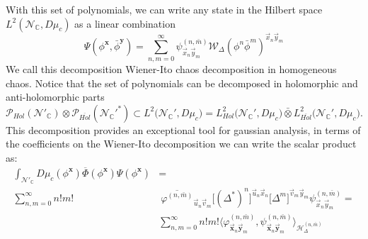 \documentclass[12pt]{article}%
\begin{document}
 With this set of polynomials, we can write any state in the Hilbert space $L^2(\mathcal{N}_\mathbb{C}, D\mu_c) $ as a linear combination 
    \begin{equation}
    \label{eq:ComplexWienerItodec}
    \Psi(\phi^{\mathbf{x}},\bar\phi^\mathbf{y})=\sum_{n,m=0}^\infty \psi^{(n,\bar{m})}_{\vec{x}_n\vec{y}_m} \mathcal{W}_\Delta(\phi^n\bar{\phi}^m)^{\vec{x}_n\vec{y}_m}
    \end{equation}
    We call this decomposition Wiener-Ito chaos decomposition in homogeneous chaos.
    Notice that the set of polynomials can be decomposed in holomorphic and anti-holomorphic parts 
    \begin{equation}
    \label{eq:ComplexPolinomials}
    \mathcal{P}_{Hol}(\mathcal{N}'_{\mathbb{C}})\otimes \mathcal{P}_{\overline{Hol}}({\mathcal{N}_{\mathbb{C}}'}^*)\subset L^2\big({\mathcal{N}_{\mathbb{C}}'},D\mu_c\big)= L^2_{Hol}\big({\mathcal{N}_{\mathbb{C}}'}, D\mu_c\big)\bar{\otimes} L^2_{\overline{Hol}}\big({\mathcal{N}_{\mathbb{C}}'}, D\mu_c\big).
    \end{equation}
    This decomposition provides an exceptional tool for gaussian analysis, in terms of the coefficients on the Wiener-Ito decomposition we can write the scalar product as:
    \begin{align}
    \label{eq:complexchaosDecomposition}
    \int_{\mathcal{N}'_\mathbb{C}}D\mu_c(\phi^\mathbf{x})\overline{\Phi}(\phi^\mathbf{x})\Psi(\phi^\mathbf{x})
    &= \nonumber \\ \sum_{n,m=0}^\infty n!m!&\ \overline{\varphi^{(n,\bar{m})}}_{\vec{u}_n\vec{v}_m}\big[(\Delta^*)^n\big]^{\vec{u}_n\vec{x}_n} \big[\Delta^m\big]^{\vec{v}_m\vec{y}_m} \psi^{(n,\bar{m})}_{\vec{x}_n\vec{y}_m}
    =\nonumber \\ &
    \sum_{n,m=0}^\infty n!m! \big\langle\varphi^{(n,\bar{m})}_{\vec{\mathbf{x}}_n\vec{\mathbf{y}}_m},\psi^{(n,\bar{m})}_{\vec{\mathbf{x}}_n\vec{\mathbf{y}}_m}\big\rangle_{\mathcal{H}^{(n,\bar{m})}_\Delta}
    \end{align}
\end{document}
